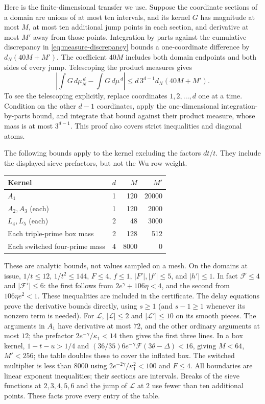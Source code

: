 \documentclass[11pt]{article}
\theoremstyle{definition}
\newcommand{\Fup}{\mathcal F}
\newcommand{\Flow}{\mathcal L}
\begin{document}
Here is the finite-dimensional transfer we use.  Suppose the coordinate
sections of a domain are unions of at most ten intervals, and its kernel
$G$ has magnitude at most $M$, at most ten additional jump points in
each section, and derivative at most $M'$ away from those points.
Integration by parts against the cumulative discrepancy in
\eqref{eq:measure-discrepancy} bounds a one-coordinate difference by
$d_N(40M+M')$.  The coefficient $40M$ includes both domain endpoints
and both sides of every jump.  Telescoping the product measures gives
\begin{equation}\label{eq:transfer}
 \left|\int G\,d\mu_N^{\,d}-\int G\,d\mu^{\,d}\right|
 \le d\,3^{d-1}d_N(40M+M').
\end{equation}
To see the telescoping explicitly, replace coordinates $1,2,\ldots,d$
one at a time.  Condition on the other $d-1$ coordinates, apply the
one-dimensional integration-by-parts bound, and integrate that bound
against their product measure, whose mass is at most $3^{d-1}$.
This proof also covers strict inequalities and diagonal atoms.

The following bounds apply to the kernel excluding the factors $dt/t$.
They include the displayed sieve prefactors, but not the Wu row weight.
\begin{center}
\begin{tabular}{@{}lrrr@{}}
\toprule
Kernel & $d$ & $M$ & $M'$\\
\midrule
$A_1$ & 1 & 120 & 20000\\
$A_2,A_3$ (each) & 1 & 120 & 2000\\
$L_4,L_5$ (each) & 2 & 48 & 3000\\
Each triple-prime box mass & 2 & 128 & 512\\
Each switched four-prime mass & 4 & 8000 & 0\\
\bottomrule
\end{tabular}
\end{center}
These are analytic bounds, not values sampled on a mesh.
On the domains at issue, $1/t\le12$, $1/t^2\le144$,
$F\le4$, $f\le1$, $|F'|,|f'|\le5$, and $|h'|\le1$.
In fact $\Fup\le4$ and $|\Fup'|\le6$: the first follows from
$2e^\gamma+106\eta<4$, and the second from
$106\eta e^2<1$.  These inequalities are included in the certificate.
The delay equations prove the derivative bounds directly, using
$s\ge1$ (and $s-1\ge1$ whenever its nonzero term is needed).
For $\Flow$, $|\Flow|\le2$ and $|\Flow'|\le10$ on its smooth pieces.
The arguments in $A_1$ have derivative at most $72$, and the other
ordinary arguments at most $12$; the prefactor
$2e^{-\gamma}/\kappa_1<14$ then gives the first three lines.
In a box kernel, $1-t-u>1/4$ and
$(36/35)6e^{-\gamma}\Fup(3\theta-\Delta)<16$, giving
$M<64$, $M'<256$; the table doubles these to cover the inflated box.
The switched multiplier is less than $8000$ using
$2e^{-2\gamma}/\kappa_1^2<100$ and $F\le4$.
All boundaries are linear exponent inequalities; their sections are
intervals.  Breaks of the sieve functions at $2,3,4,5,6$ and the jump
of $\Flow$ at $2$ use fewer than ten additional points.
These facts prove every entry of the table.
\end{document}
